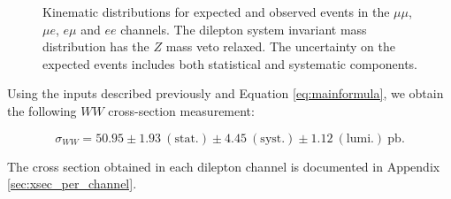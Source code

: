 \begin{figure}[!hbtp]
\begin{center}
\caption{Kinematic distributions for expected and observed events in the  $\mu\mu$, $\mu{e}$, $e\mu$ and $ee$ channels.
The dilepton system invariant mass distribution has the $Z$ mass veto relaxed.
The uncertainty on the expected events includes both statistical and systematic components.}
\label{fig:inclplots}
\end{center}
\end{figure}


Using the inputs described previously and Equation \ref{eq:mainformula},
we obtain the following $WW$ cross-section measurement:

\begin{equation*}
\sigma_{WW}  = 50.95 \pm 1.93~\mathrm{(stat.)} \pm 4.45~\mathrm{(syst.)} \pm 1.12~\mathrm{(lumi.)~pb}.
\end{equation*}

The cross section obtained in each dilepton channel is documented in Appendix \ref{sec:xsec_per_channel}.

